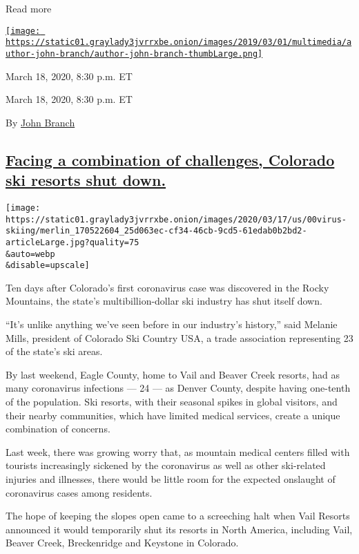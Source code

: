 Read more

\href{https://www.nytimes3xbfgragh.onion/by/john-branch}{\texttt{[image: https://static01.graylady3jvrrxbe.onion/images/2019/03/01/multimedia/author-john-branch/author-john-branch-thumbLarge.png]}}

March 18, 2020, 8:30 p.m. ET

March 18, 2020, 8:30 p.m. ET

By \href{https://www.nytimes3xbfgragh.onion/by/john-branch}{John Branch}

\hypertarget{facing-a-combination-of-challenges-colorado-ski-resorts-shut-down}{%
\subsection{\texorpdfstring{\protect\hyperlink{facing-a-combination-of-challenges-colorado-ski-resorts-shut-down}{Facing
a combination of challenges, Colorado ski resorts shut
down.}}{Facing a combination of challenges, Colorado ski resorts shut down.}}\label{facing-a-combination-of-challenges-colorado-ski-resorts-shut-down}}

\texttt{[image: https://static01.graylady3jvrrxbe.onion/images/2020/03/17/us/00virus-skiing/merlin\_170522604\_25d063ec-cf34-46cb-9cd5-61edab0b2bd2-articleLarge.jpg?quality=75\\\&auto=webp\\\&disable=upscale]}

Ten days after Colorado's first coronavirus case was discovered in the
Rocky Mountains, the state's multibillion-dollar ski industry has shut
itself down.

``It's unlike anything we've seen before in our industry's history,''
said Melanie Mills, president of Colorado Ski Country USA, a trade
association representing 23 of the state's ski areas.

By last weekend, Eagle County, home to Vail and Beaver Creek resorts,
had as many coronavirus infections --- 24 --- as Denver County, despite
having one-tenth of the population. Ski resorts, with their seasonal
spikes in global visitors, and their nearby communities, which have
limited medical services, create a unique combination of concerns.

Last week, there was growing worry that, as mountain medical centers
filled with tourists increasingly sickened by the coronavirus as well as
other ski-related injuries and illnesses, there would be little room for
the expected onslaught of coronavirus cases among residents.

The hope of keeping the slopes open came to a screeching halt when Vail
Resorts announced it would temporarily shut its resorts in North
America, including Vail, Beaver Creek, Breckenridge and Keystone in
Colorado.

